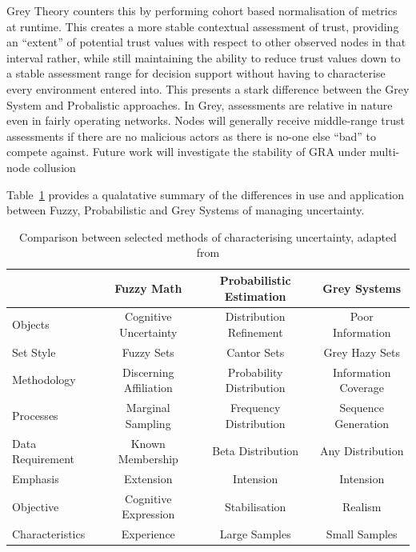 \documentclass[runningheads,a4paper]{llncs}
\begin{document}
Grey Theory counters this by performing cohort based normalisation of metrics at runtime. 
This creates a more stable contextual assessment of trust, providing an ``extent'' of potential trust values with respect to other observed nodes in that interval rather, while still maintaining the ability to reduce trust values down to a stable assessment range for decision support without having to characterise every environment entered into.
This presents a stark difference between the Grey System and Probalistic approaches.
In Grey, assessments are relative in nature even in fairly operating networks.
Nodes will generally receive middle-range trust assessments if there are no malicious actors as there is no-one else ``bad'' to compete against.
Future work will investigate the stability of GRA under multi-node collusion

Table~\ref{tab:uncertainty} provides a qualatative summary of the differences in use and application between Fuzzy, Probabilistic and Grey Systems of managing uncertainty.


\begin{table}[h]
  \caption{Comparison between selected methods of characterising uncertainty, adapted from \cite{Ng1994} \cite{Liu2006} \cite{Wang2006} \cite{Guo11}}
  \label{tab:uncertainty}
  \begin{center}
    \setlength{\tabcolsep}{8pt}
    \begin{tabular}{l|ccc}
      \toprule
        & Fuzzy Math & Probabilistic Estimation & Grey Systems \\
      \midrule
      Objects & Cognitive Uncertainty & Distribution Refinement & Poor Information \\
      Set Style & Fuzzy Sets & Cantor Sets & Grey Hazy Sets \\
      Methodology & Discerning Affiliation & Probability Distribution & Information Coverage \\
      Processes & Marginal Sampling & Frequency Distribution & Sequence Generation \\
      Data Requirement & Known Membership & Beta Distribution & Any Distribution \\
      Emphasis & Extension & Intension & Intension \\
      Objective & Cognitive Expression & Stabilisation & Realism \\
      Characteristics & Experience & Large Samples & Small Samples\\
     \bottomrule
    \end{tabular}
    \setlength{\tabcolsep}{6pt}
  \end{center}
\end{table}
\end{document}

